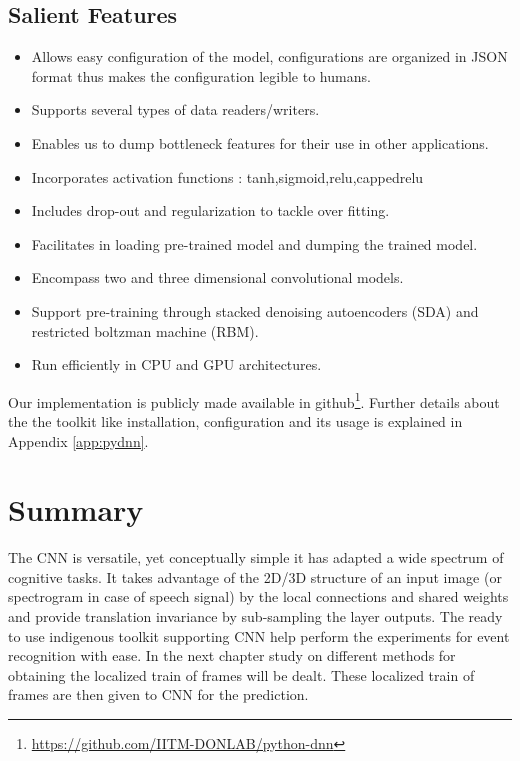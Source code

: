 \subsection{Salient Features}
\begin{itemize}
	\item Allows easy configuration of the model, configurations are organized in JSON format thus makes the configuration legible to humans.
	\item Supports several types of data readers/writers. 
	\item Enables us to dump bottleneck features for their use in other applications.
	\item Incorporates activation functions : tanh,sigmoid,relu,cappedrelu
	\item Includes drop-out and regularization to tackle over fitting.
	\item Facilitates in loading pre-trained model and dumping the trained model.
	\item Encompass two and three dimensional convolutional models.
	\item Support pre-training through stacked denoising autoencoders (SDA) and restricted boltzman machine (RBM).
	\item Run efficiently in CPU and GPU architectures.	
\end{itemize}
Our implementation is publicly made available in github\footnote{\url{https://github.com/IITM-DONLAB/python-dnn}}. Further details about the the toolkit like installation, configuration and its usage is explained in Appendix \ref{app:pydnn}.

\section{Summary}
The CNN is versatile, yet conceptually simple it has adapted a wide spectrum of cognitive tasks.
It takes advantage of the 2D/3D structure of an input image (or spectrogram in case of speech signal) by the local connections and shared weights and provide translation invariance by sub-sampling the layer outputs. The ready to use indigenous toolkit supporting CNN help perform the experiments for event recognition with ease. In the next chapter study on different methods for obtaining the localized train of frames will be dealt. These localized train of frames are then given to CNN for the prediction.